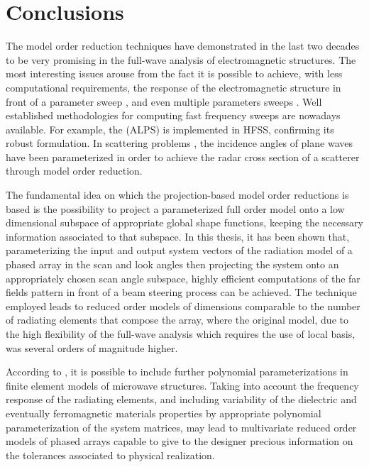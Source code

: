 \cleardoublepage
\thispagestyle{myheadings}
\renewcommand\thefigure{\arabic{figure}}
\pagestyle{myheadings}
{}
\chapter*{Conclusions}

\par The model order reduction techniques have demonstrated in the last two decades to be very promising in the full-wave analysis of electromagnetic structures. The most interesting issues arouse from the fact it is possible to achieve, with less computational requirements, the response of the electromagnetic structure in front of a parameter sweep \cite{SelleriEdlingerDDMOR}, and even multiple parameters sweeps \cite{FarleMORFE}. Well established methodologies for computing fast frequency sweeps are nowadays available. For example, the  (ALPS) \cite{BrackenSunCendesSDom} is implemented in HFSS, confirming its robust formulation. In scattering problems \cite{LedgerPerairePESSRIWA}, the incidence angles of plane waves have been parameterized in order to achieve the radar cross section of a scatterer through model order reduction.

\par The fundamental idea on which the projection-based model order reductions  is based is the possibility to project a parameterized full order model onto a low dimensional subspace of appropriate global shape functions, keeping the necessary information associated to that subspace. In this thesis, it has been shown that, parameterizing the input and output system vectors of the radiation model of a phased array in the scan and look angles then projecting the system onto an appropriately chosen scan angle subspace, highly efficient computations of the far fields pattern in front of a beam steering process can be achieved. The technique employed leads to reduced order models of dimensions comparable to the number of radiating elements that compose the array, where the original model, due to the high flexibility of the full-wave analysis which requires the use of local basis, was several orders of magnitude higher.

\par According to \cite{FarleMORFE}, it is possible to include further polynomial parameterizations in finite element models of microwave structures. Taking into account the frequency response of the radiating elements, and including variability of the dielectric and eventually ferromagnetic materials properties by appropriate polynomial parameterization of the system matrices, may lead to multivariate reduced order models of phased arrays capable to give to the designer precious information on the tolerances associated to physical realization. 

